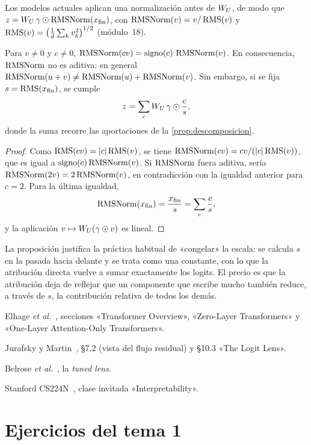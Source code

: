 Los modelos actuales aplican una normalización antes de $W_{U}$, de modo que $z=W_{U}\,\gamma\odot\operatorname{RMSNorm}(x_{\mathrm{fin}})$, con $\operatorname{RMSNorm}(v)=v/\operatorname{RMS}(v)$ y $\operatorname{RMS}(v)=\bigl(\tfrac1d\sum_kv_k^{2}\bigr)^{1/2}$ (módulo~18).

\begin{proposicion}\label{prop:rmsnorm}
Para $v\neq 0$ y $c\neq 0$, $\operatorname{RMSNorm}(cv)=\operatorname{signo}(c)\,\operatorname{RMSNorm}(v)$. En consecuencia, $\operatorname{RMSNorm}$ no es aditiva: en general $\operatorname{RMSNorm}(u+v)\neq\operatorname{RMSNorm}(u)+\operatorname{RMSNorm}(v)$. Sin embargo, si se fija $s=\operatorname{RMS}(x_{\mathrm{fin}})$, se cumple
\[
z=\sum_{c}W_{U}\,\gamma\odot\frac{c}{s},
\]
donde la suma recorre las aportaciones de la \cref{prop:descomposicion}.
\end{proposicion}

\begin{proof}
Como $\operatorname{RMS}(cv)=\lvert c\rvert\operatorname{RMS}(v)$, se tiene $\operatorname{RMSNorm}(cv)=cv/(\lvert c\rvert\operatorname{RMS}(v))$, que es igual a $\operatorname{signo}(c)\operatorname{RMSNorm}(v)$. Si $\operatorname{RMSNorm}$ fuera aditiva, sería $\operatorname{RMSNorm}(2v)=2\operatorname{RMSNorm}(v)$, en contradicción con la igualdad anterior para $c=2$. Para la última igualdad,
\[
\operatorname{RMSNorm}(x_{\mathrm{fin}})=\frac{x_{\mathrm{fin}}}{s}=\sum_c\frac{c}{s},
\]
y la aplicación $v\mapsto W_{U}(\gamma\odot v)$ es lineal.
\end{proof}

La proposición justifica la práctica habitual de «congelar» la escala: se calcula $s$ en la pasada hacia delante y se trata como una constante, con lo que la atribución directa vuelve a sumar exactamente los logits. El precio es que la atribución deja de reflejar que un componente que escribe mucho también reduce, a través de $s$, la contribución relativa de todos los demás.

\begin{lecturas}
\item Elhage \emph{et al.}~\cite{elhage21}, secciones «Transformer Overview», «Zero-Layer Transformers» y «One-Layer Attention-Only Transformers».
\item Jurafsky y Martin~\cite{jm3}, §7.2 (vista del flujo residual) y §10.3 «The Logit Lens».
\item Belrose \emph{et al.}~\cite{belrose}, la \emph{tuned lens}.
\item Stanford CS224N~\cite{cs224n}, clase invitada «Interpretability».
\end{lecturas}

\section*{Ejercicios del tema 1}

